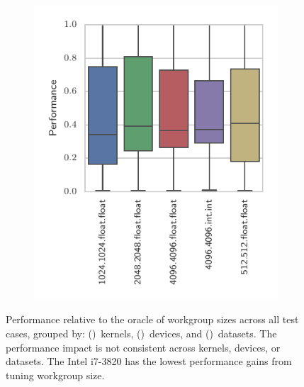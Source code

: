 \documentclass[nonatbib,preprint,nocopyrightspace,9pt]{sigplanconf}
\begin{document}
\begin{figure}
\begin{subfigure}[h]{.48\columnwidth}
    \vspace{-1.5em} %
    \caption{}
    \label{fig:performance-devices}
  \end{subfigure}
  ~%
  \begin{subfigure}[h]{.48\columnwidth}
    \centering
    \includegraphics[width=\columnwidth]{img/performance_datasets.pdf}
    \vspace{-1.5em} %
    \caption{}
    \label{fig:performance-datasets}
  \end{subfigure}
  \caption{%
    Performance relative to the oracle of workgroup sizes across all
    test cases, grouped by:
    ()~kernels,
    ()~devices, and
    ()~datasets. The performance
    impact is not consistent across kernels, devices, or datasets. The
    Intel i7-3820 has the lowest performance gains from tuning
    workgroup size.%
    \vspace{-2em}
  }
  \label{fig:performances}
\end{figure}
\end{document}
